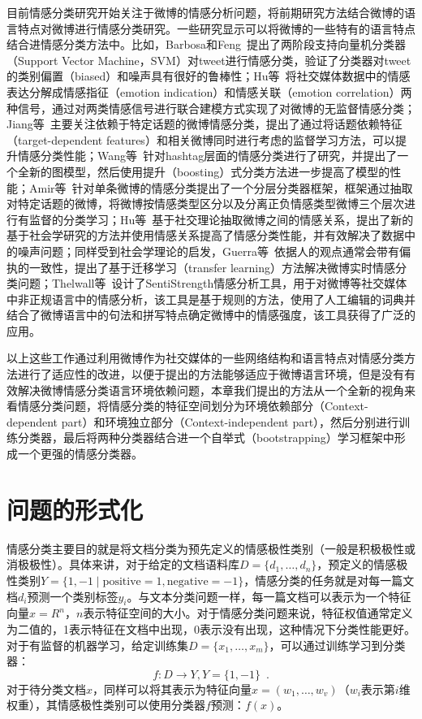 目前情感分类研究开始关注于微博的情感分析问题，将前期研究方法结合微博的语言特点对微博进行情感分类研究。一些研究显示可以将微博的一些特有的语言特点结合进情感分类方法中。比如，Barbosa和Feng~提出了两阶段支持向量机分类器（Support Vector Machine，SVM）对tweet进行情感分类，验证了分类器对tweet的类别偏置（biased）和噪声具有很好的鲁棒性；Hu等~将社交媒体数据中的情感表达分解成情感指征（emotion indication）和情感关联（emotion correlation）两种信号，通过对两类情感信号进行联合建模方式实现了对微博的无监督情感分类；Jiang等~主要关注依赖于特定话题的微博情感分类，提出了通过将话题依赖特征（target-dependent features）和相关微博同时进行考虑的监督学习方法，可以提升情感分类性能；Wang等~针对hashtag层面的情感分类进行了研究，并提出了一个全新的图模型，然后使用提升（boosting）式分类方法进一步提高了模型的性能；Amir等~针对单条微博的情感分类提出了一个分层分类器框架，框架通过抽取对特定话题的微博，将微博按情感类型区分以及分离正负情感类型微博三个层次进行有监督的分类学习；Hu等~基于社交理论抽取微博之间的情感关系，提出了新的基于社会学研究的方法并使用情感关系提高了情感分类性能，并有效解决了数据中的噪声问题；同样受到社会学理论的启发，Guerra等~依据人的观点通常会带有偏执的一致性，提出了基于迁移学习（transfer learning）方法解决微博实时情感分类问题；Thelwall等~设计了SentiStrength情感分析工具，用于对微博等社交媒体中非正规语言中的情感分析，该工具是基于规则的方法，使用了人工编辑的词典并结合了微博语言中的句法和拼写特点确定微博中的情感强度，该工具获得了广泛的应用。

以上这些工作通过利用微博作为社交媒体的一些网络结构和语言特点对情感分类方法进行了适应性的改进，以便于提出的方法能够适应于微博语言环境，但是没有有效解决微博情感分类语言环境依赖问题，本章我们提出的方法从一个全新的视角来看情感分类问题，将情感分类的特征空间划分为环境依赖部分（Context-dependent part）和环境独立部分（Context-independent part），然后分别进行训练分类器，最后将两种分类器结合进一个自举式（bootstrapping）学习框架中形成一个更强的情感分类器。

\section{问题的形式化}
\label{ch4_form}
情感分类主要目的就是将文档分类为预先定义的情感极性类别（一般是积极极性或消极极性）。具体来讲，对于给定的文档语料库$ D=\lbrace d_{1},\dots ,d_{n} \rbrace$，预定义的情感极性类别$ Y=\lbrace 1,-1\mid \mathrm{positive}=1,\mathrm{negative}=-1 \rbrace$，情感分类的任务就是对每一篇文档$ d_{i} $预测一个类别标签$ y_{i} $。与文本分类问题一样，每一篇文档可以表示为一个特征向量$ x=R^{n} $，$ n $表示特征空间的大小。对于情感分类问题来说，特征权值通常定义为二值的，1表示特征在文档中出现，0表示没有出现，这种情况下分类性能更好。对于有监督的机器学习，给定训练集$ D=\lbrace x_{1},\dots,x_{m} \rbrace $，可以通过训练学习到分类器：
\begin{equation}
\label{e1}
  f:D \rightarrow Y, Y=\lbrace 1,-1 \rbrace \enspace .
\end{equation} 
对于待分类文档$ x $，同样可以将其表示为特征向量$ x=\left( w_{1},\dots,w_{v} \right)  $（$ w_{i} $表示第$ i $维权重），其情感极性类别可以使用分类器$ f $预测：$ f \left( x \right)   $。

